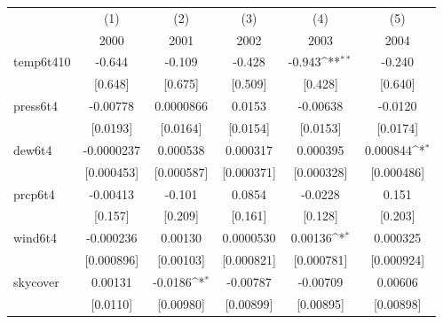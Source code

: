 \documentclass[11pt]{article}
\begin{document}
\begin{subappendices}
		\newpage
		\begin{center}
			 \label{tab:title} 
			{
			{
				\def\sym#1{\ifmmode^{#1}\else\(^{#1}\)\fi}
				\begin{tabular}{l*{5}{c}}
					\hline\hline
					&\multicolumn{1}{c}{(1)}&\multicolumn{1}{c}{(2)}&\multicolumn{1}{c}{(3)}&\multicolumn{1}{c}{(4)}&\multicolumn{1}{c}{(5)}\\
					&\multicolumn{1}{c}{2000}&\multicolumn{1}{c}{2001}&\multicolumn{1}{c}{2002}&\multicolumn{1}{c}{2003}&\multicolumn{1}{c}{2004}\\
					\hline
					temp6t410   &      -0.644         &      -0.109         &      -0.428         &      -0.943\sym{**} &      -0.240         \\
					&     [0.648]         &     [0.675]         &     [0.509]         &     [0.428]         &     [0.640]         \\
					[1em]
					press6t4    &    -0.00778         &   0.0000866         &      0.0153         &    -0.00638         &     -0.0120         \\
					&    [0.0193]         &    [0.0164]         &    [0.0154]         &    [0.0153]         &    [0.0174]         \\
					[1em]
					dew6t4      &  -0.0000237         &    0.000538         &    0.000317         &    0.000395         &    0.000844\sym{*}  \\
					&  [0.000453]         &  [0.000587]         &  [0.000371]         &  [0.000328]         &  [0.000486]         \\
					[1em]
					prcp6t4     &    -0.00413         &      -0.101         &      0.0854         &     -0.0228         &       0.151         \\
					&     [0.157]         &     [0.209]         &     [0.161]         &     [0.128]         &     [0.203]         \\
					[1em]
					wind6t4     &   -0.000236         &     0.00130         &   0.0000530         &     0.00136\sym{*}  &    0.000325         \\
					&  [0.000896]         &   [0.00103]         &  [0.000821]         &  [0.000781]         &  [0.000924]         \\
					[1em]
					skycover    &     0.00131         &     -0.0186\sym{*}  &    -0.00787         &    -0.00709         &     0.00606         \\
					&    [0.0110]         &   [0.00980]         &   [0.00899]         &   [0.00895]         &   [0.00898]         \\

\end{tabular}}}
\end{center}
\end{subappendices}
\end{document}
